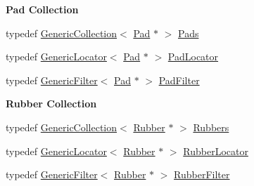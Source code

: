 \begin{Indent}\textbf{ Pad Collection}\par
\begin{DoxyCompactItemize}
\item 
typedef \mbox{\hyperlink{classHurricane_1_1GenericCollection}{Generic\+Collection}}$<$ \mbox{\hyperlink{classHurricane_1_1Pad}{Pad}} $\ast$ $>$ \mbox{\hyperlink{namespaceHurricane_abd1f433c44d8b515e1b8a8810aea1610}{Pads}}
\item 
typedef \mbox{\hyperlink{classHurricane_1_1GenericLocator}{Generic\+Locator}}$<$ \mbox{\hyperlink{classHurricane_1_1Pad}{Pad}} $\ast$ $>$ \mbox{\hyperlink{namespaceHurricane_a733c2eb75cde14a8b6a2e62edfbd2792}{Pad\+Locator}}
\item 
typedef \mbox{\hyperlink{classHurricane_1_1GenericFilter}{Generic\+Filter}}$<$ \mbox{\hyperlink{classHurricane_1_1Pad}{Pad}} $\ast$ $>$ \mbox{\hyperlink{namespaceHurricane_aeff6d8148675fc30f366906bfc652c25}{Pad\+Filter}}
\end{DoxyCompactItemize}
\end{Indent}
\begin{Indent}\textbf{ Rubber Collection}\par
\begin{DoxyCompactItemize}
\item 
typedef \mbox{\hyperlink{classHurricane_1_1GenericCollection}{Generic\+Collection}}$<$ \mbox{\hyperlink{classHurricane_1_1Rubber}{Rubber}} $\ast$ $>$ \mbox{\hyperlink{namespaceHurricane_af8923abd57508cc44931a00d61b564ad}{Rubbers}}
\item 
typedef \mbox{\hyperlink{classHurricane_1_1GenericLocator}{Generic\+Locator}}$<$ \mbox{\hyperlink{classHurricane_1_1Rubber}{Rubber}} $\ast$ $>$ \mbox{\hyperlink{namespaceHurricane_ae4f27278e942109c3c47ad1b741f9df3}{Rubber\+Locator}}
\item 
typedef \mbox{\hyperlink{classHurricane_1_1GenericFilter}{Generic\+Filter}}$<$ \mbox{\hyperlink{classHurricane_1_1Rubber}{Rubber}} $\ast$ $>$ \mbox{\hyperlink{namespaceHurricane_ae331d428a7e324593e4a47dac023b7f0}{Rubber\+Filter}}
\end{DoxyCompactItemize}
\end{Indent}
